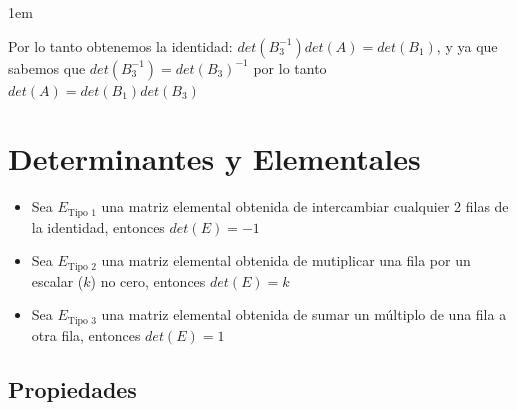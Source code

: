 \documentclass[12pt, fleqn]{report}                             %
\newenvironment{SmallIndentation}[1][0.75em]                    %
        {\begin{adjustwidth}{#1}{}\begin{footnotesize}}             %
        {\end{footnotesize}\end{adjustwidth}}                       %
\theoremstyle{break}                                            %
\begin{document}
\begin{itemize}
\begin{SmallIndentation}[1em]
                            Por lo tanto obtenemos la identidad:
                            $det(B_3^{-1}) det(A) = det(B_1)$, y ya que sabemos que $det(B_3^{-1}) = det(B_3)^{-1}$ por lo tanto
                            $det(A) = det(B_1) det(B_3)$
                        
                        \end{SmallIndentation}

                \end{itemize}


        \clearpage
        \section{Determinantes y Elementales}

            \begin{itemize}
                
                \item 
                    Sea $E_{\text{Tipo 1}}$ una matriz elemental obtenida de intercambiar
                    cualquier 2 filas de la identidad, entonces $det(E) = -1$

                \item 
                    Sea $E_{\text{Tipo 2}}$ una matriz elemental obtenida de mutiplicar
                    una fila por un escalar ($k$) no cero, entonces $det(E) = k$

                \item 
                    Sea $E_{\text{Tipo 3}}$ una matriz elemental obtenida de sumar
                    un múltiplo de una fila a otra fila, entonces $det(E) = 1$

            \end{itemize}


            \clearpage
            \subsection{Propiedades}
\end{document}
